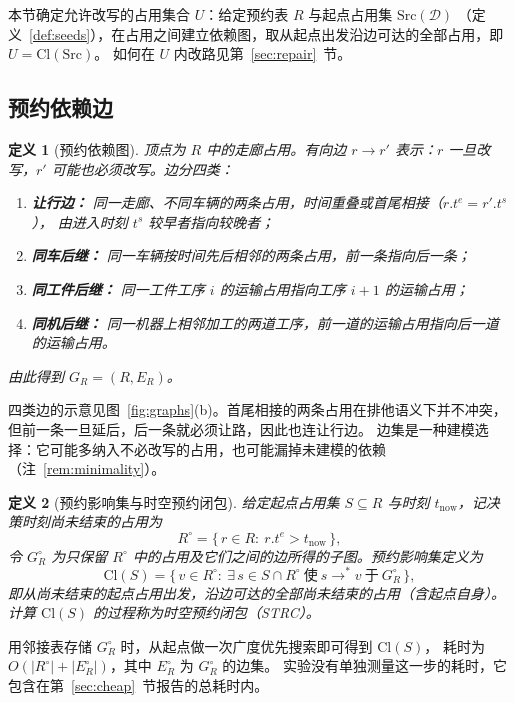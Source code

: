 \documentclass[manuscript,screen,review]{acmart}
\providecommand{\STRC}{\textsc{STRC}}
\newtheorem{definition}{定义}
\begin{document}
本节确定允许改写的占用集合 \(U\)：给定预约表 \(R\) 与起点占用集 \(\mathrm{Src}(\mathcal{D})\)
（定义~\ref{def:seeds}），在占用之间建立依赖图，取从起点出发沿边可达的全部占用，即 \(U=\mathrm{Cl}(\mathrm{Src})\)。
如何在 \(U\) 内改路见第~\ref{sec:repair}~节。

\subsection{预约依赖边}
\label{sec:closure_def}

\begin{definition}[预约依赖图]
\label{def:dep}
顶点为 \(R\) 中的走廊占用。有向边 \(r\to r'\) 表示：\(r\) 一旦改写，\(r'\) 可能也必须改写。边分四类：
\begin{enumerate}[leftmargin=1.4em,itemsep=0.15em]
\item \textbf{让行边：} 同一走廊、不同车辆的两条占用，时间重叠或首尾相接（\(r.t^e=r'.t^s\)），
由进入时刻 \(t^s\) 较早者指向较晚者；
\item \textbf{同车后继：} 同一车辆按时间先后相邻的两条占用，前一条指向后一条；
\item \textbf{同工件后继：} 同一工件工序 \(i\) 的运输占用指向工序 \(i+1\) 的运输占用；
\item \textbf{同机后继：} 同一机器上相邻加工的两道工序，前一道的运输占用指向后一道的运输占用。
\end{enumerate}
由此得到 \(G_R=(R,E_R)\)。
\end{definition}

四类边的示意见图~\ref{fig:graphs}(b)。首尾相接的两条占用在排他语义下并不冲突，
但前一条一旦延后，后一条就必须让路，因此也连让行边。
边集是一种建模选择：它可能多纳入不必改写的占用，也可能漏掉未建模的依赖（注~\ref{rem:minimality}）。

\begin{definition}[预约影响集与时空预约闭包]
\label{def:strc}
给定起点占用集 \(S\subseteq R\) 与时刻 \(t_{\mathrm{now}}\)，记决策时刻尚未结束的占用为
\[
R^{\circ}=\bigl\{\,r\in R:\ r.t^e>t_{\mathrm{now}}\,\bigr\},
\]
令 \(G_R^\circ\) 为只保留 \(R^{\circ}\) 中的占用及它们之间的边所得的子图。预约影响集定义为
\[
\mathrm{Cl}(S)
=\bigl\{\,v\in R^{\circ}:\
\exists\,s\in S\cap R^{\circ}\ \text{使}\ s\!\to^*\!v\ \text{于}\ G_R^\circ\,\bigr\},
\]
即从尚未结束的起点占用出发，沿边可达的全部尚未结束的占用（含起点自身）。
计算 \(\mathrm{Cl}(S)\) 的过程称为时空预约闭包（\STRC）。
\end{definition}

用邻接表存储 \(G_R^\circ\) 时，从起点做一次广度优先搜索即可得到 \(\mathrm{Cl}(S)\)，
耗时为 \(O(|R^{\circ}|+|E_R^{\circ}|)\)，其中 \(E_R^{\circ}\) 为 \(G_R^\circ\) 的边集。
实验没有单独测量这一步的耗时，它包含在第~\ref{sec:cheap}~节报告的总耗时内。
\end{document}
